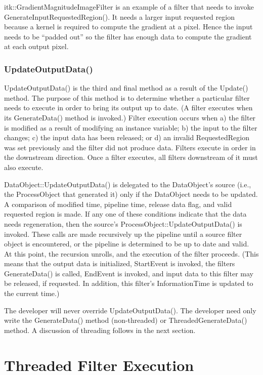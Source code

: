 itk::GradientMagnitudeImageFilter is an example of a filter that needs to
invoke GenerateInputRequestedRegion(). It needs a larger input requested
region because a kernel is required to compute the gradient at a pixel. Hence
the input needs to be ``padded out'' so the filter has enough data to compute
the gradient at each output pixel.

\subsubsection{UpdateOutputData()}
\label{sec:UpdateOutputData}

UpdateOutputData() is the third and final method as a result of the Update()
method. The purpose of this method is to determine whether a particular
filter needs to execute in order to bring its output up to date. (A filter
executes when its GenerateData() method is invoked.) Filter execution occurs
when a) the filter is modified as a result of modifying an instance variable;
b) the input to the filter changes; c) the input data has been released; or
d) an invalid RequestedRegion was set previously and the filter did not
produce data. Filters execute in order in the downstream direction. Once a
filter executes, all filters downstream of it must also execute.

DataObject::UpdateOutputData() is delegated to the DataObject's source (i.e.,
the ProcessObject that generated it) only if the DataObject needs to be
updated. A comparison of modified time, pipeline time, release data flag, and
valid requested region is made. If any one of these conditions indicate that
the data needs regeneration, then the source's
ProcessObject::UpdateOutputData() is invoked. These calls are made
recursively up the pipeline until a source filter object is encountered, or
the pipeline is determined to be up to date and valid. At this point, the
recursion unrolls, and the execution of the filter proceeds. (This means that
the output data is initialized, StartEvent is invoked, the filters
GenerateData() is called, EndEvent is invoked, and input data to this filter
may be released, if requested. In addition, this filter's InformationTime is
updated to the current time.)

The developer will never override UpdateOutputData(). The developer need only
write the GenerateData() method (non-threaded) or ThreadedGenerateData()
method. A discussion of threading follows in the next section.


\section{Threaded Filter Execution}
\label{sec:ThreadedFilterExecution}

